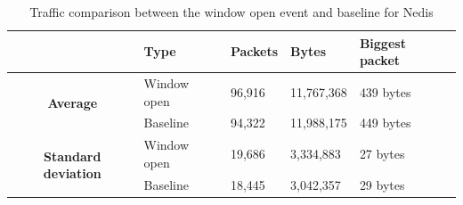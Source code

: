 \begin{table}[H]
    \centering
    \caption{Traffic comparison between the window open event and baseline for Nedis}
    \begin{tabular}{c|l|l|l|l|}
        \cline{2-5}
        \multicolumn{1}{l|}{}                                              & \textbf{Type} & \textbf{Packets} & \textbf{Bytes} & \textbf{Biggest packet} \\ \hline
        \multicolumn{1}{|c|}{\multirow{2}{*}{\textbf{Average}}}            & Window open         & 96,916             & 11,767,368      & 439 bytes               \\ \cline{2-5} 
        \multicolumn{1}{|c|}{}                                             & Baseline      & 94,322             & 11,988,175      & 449 bytes                \\ \hline
        \multicolumn{1}{|c|}{\multirow{2}{*}{\textbf{Standard deviation}}} & Window open         & 19,686             & 3,334,883       & 27 bytes                 \\ \cline{2-5} 
        \multicolumn{1}{|c|}{}                                             & Baseline      & 18,445             & 3,042,357       & 29 bytes               \\ \hline          
    \end{tabular}
    \label{tab:NedisComparingBaselineAndWindowCalculations}
\end{table}

